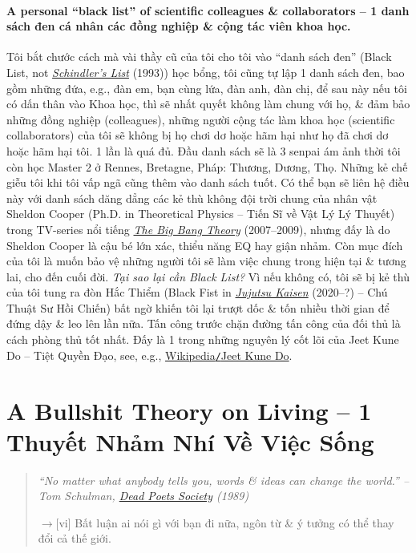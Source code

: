 \documentclass[12pt,oneside]{book}
\begin{document}
\subsubsection*{A personal ``black list'' of scientific colleagues \& collaborators -- 1 danh sách đen cá nhân các đồng nghiệp \& cộng tác viên khoa học.} Tôi bắt chước cách mà vài thầy cũ của tôi cho tôi vào ``danh sách đen'' (Black List, not \href{https://www.imdb.com/title/tt0108052/}{\it Schindler's List} (1993)) học bổng, tôi cũng tự lập 1 danh sách đen, bao gồm những đứa, e.g., đàn em, bạn cùng lứa, đàn anh, đàn chị, để sau này nếu tôi có dấn thân vào Khoa học, thì sẽ nhất quyết không làm chung với họ, \& đảm bảo những đồng nghiệp (colleagues), những người cộng tác làm khoa học (scientific collaborators) của tôi sẽ không bị họ chơi dơ hoặc hãm hại như họ đã chơi dơ hoặc hãm hại tôi. 1 lần là quá đủ. Đầu danh sách sẽ là 3 senpai ám ảnh thời tôi còn học Master 2 ở Rennes, Bretagne, Pháp: {\sf Thương, Dương, Thọ}. Những kẻ chế giễu tôi khi tôi vấp ngã cũng thêm vào danh sách tuốt. Có thể bạn sẽ liên hệ điều này với danh sách dăng dẳng các kẻ thù không đội trời chung của nhân vật {\sf Sheldon Cooper} (Ph.D. in Theoretical Physics -- Tiến Sĩ về Vật Lý Lý Thuyết) trong TV-series nổi tiếng \href{https://www.imdb.com/title/tt0898266}{\it The Big Bang Theory} (2007--2009), nhưng đấy là do {\sf Sheldon Cooper} là cậu bé lớn xác, thiểu năng EQ hay giận nhảm. Còn mục đích của tôi là muốn bảo vệ những người tôi sẽ làm việc chung trong hiện tại \& tương lai, cho đến cuối đời. {\it Tại sao lại cần Black List?} Vì nếu không có, tôi sẽ bị kẻ thù của tôi tung ra đòn Hắc Thiểm (Black Fist in \href{https://www.imdb.com/title/tt12343534/}{\it Jujutsu Kaisen} (2020--?) -- Chú Thuật Sư Hồi Chiến) bất ngờ khiến tôi lại trượt dốc \& tốn nhiều thời gian để đứng dậy \& leo lên lần nữa. Tấn công trước chặn đường tấn công của đối thủ là cách phòng thủ tốt nhất. Đấy là 1 trong những nguyên lý cốt lõi của {\sf Jeet Kune Do -- Tiệt Quyền Đạo}, see, e.g., \href{https://en.wikipedia.org/wiki/Jeet_Kune_Do}{Wikipedia{\tt/}Jeet Kune Do}.


\chapter{A Bullshit Theory on Living -- 1 Thuyết Nhảm Nhí Về Việc Sống}
\label{sect: bullshit theory on live}
\minitoc

\begin{quotation}\it
	``No matter what anybody tells you, words \& ideas can change the world.'' -- {\sc Tom Schulman}, \href{https://www.imdb.com/title/tt0097165}{Dead Poets Society} (1989)
	
	{\sf[en]$\to$[vi]} Bất luận ai nói gì với bạn đi nữa, ngôn từ \& ý tưởng có thể thay đổi cả thế giới.
\end{quotation}
\end{document}
